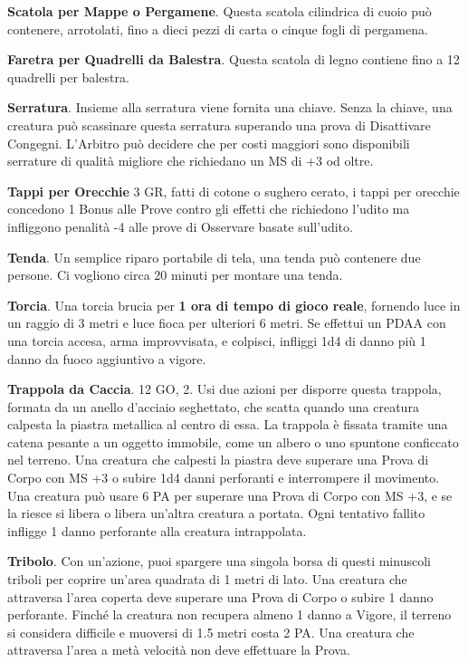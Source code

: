 \documentclass[12pt,a4paper,twoside,openany]{book}
\begin{document}
\begin{multicols}{2}
\textbf{Scatola per Mappe o Pergamene}. Questa scatola cilindrica di cuoio può contenere, arrotolati, fino a dieci pezzi di carta o cinque fogli di pergamena.

\textbf{Faretra per Quadrelli da Balestra}. Questa scatola di legno contiene fino a 12 quadrelli per balestra.

\textbf{Serratura}. Insieme alla serratura viene fornita una chiave. Senza la chiave, una creatura può scassinare questa serratura superando una prova di Disattivare Congegni. L'Arbitro può decidere che per costi maggiori sono disponibili serrature di qualità migliore che richiedano un MS di +3 od oltre.

\textbf{Tappi per Orecchie} 3 GR, fatti di cotone o sughero cerato, i tappi per orecchie concedono 1 Bonus alle Prove contro gli effetti che richiedono l'udito ma infliggono penalità -4 alle prove di Osservare basate sull'udito.

\textbf{Tenda}. Un semplice riparo portabile di tela, una tenda può contenere due persone. Ci vogliono circa 20 minuti per montare una tenda.

\textbf{Torcia}. Una torcia brucia per \textbf{1 ora di tempo di gioco reale}, fornendo luce in un raggio di 3 metri e luce fioca per ulteriori 6 metri. Se effettui un PDAA con una torcia accesa, arma improvvisata, e colpisci, infliggi 1d4 di danno più 1 danno da fuoco aggiuntivo a vigore. 

\textbf{Trappola da Caccia}. 12 GO, 2. Usi due azioni per disporre questa trappola, formata da un anello d’acciaio seghettato, che scatta quando una creatura calpesta la piastra metallica al centro di essa. La trappola è fissata tramite una catena pesante a un oggetto immobile, come un albero o uno spuntone conficcato nel terreno. Una creatura che calpesti la piastra deve superare una Prova di Corpo con MS +3 o subire 1d4 danni perforanti e interrompere il movimento. Una creatura può usare 6 PA per superare una Prova di Corpo con MS +3, e se la riesce si libera o libera un’altra creatura a portata. Ogni tentativo fallito infligge 1 danno perforante alla creatura intrappolata.

\textbf{Tribolo}. Con un’azione, puoi spargere una singola borsa di questi minuscoli triboli per coprire un’area quadrata di 1 metri di lato. Una creatura che attraversa l’area coperta deve superare una Prova di Corpo o subire 1 danno perforante. Finché la creatura non recupera almeno 1 danno a Vigore, il terreno si considera difficile e muoversi di 1.5 metri costa 2 PA. Una creatura che attraversa l’area a metà velocità non deve effettuare la Prova.


\end{multicols}
\end{document}

